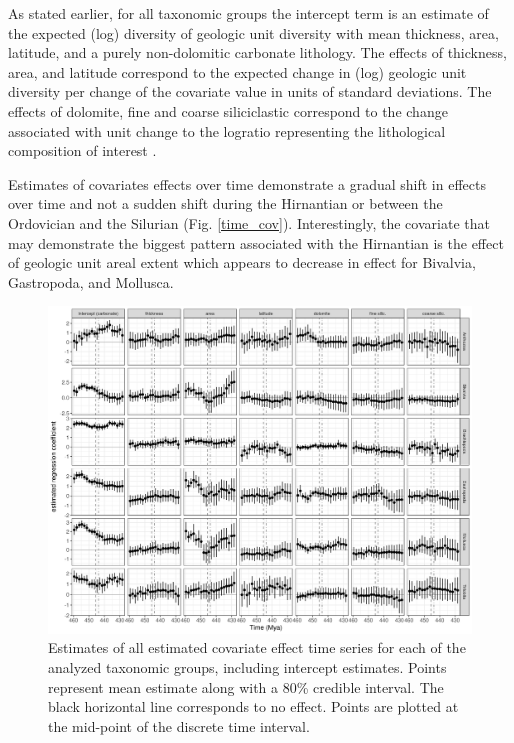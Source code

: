 \documentclass[12pt,letterpaper]{article}
\begin{document}
As stated earlier, for all taxonomic groups the intercept term is an estimate of the expected (log) diversity of geologic unit diversity with mean thickness, area, latitude, and a purely non-dolomitic carbonate lithology. The effects of thickness, area, and latitude correspond to the expected change in (log) geologic unit diversity per change of the covariate value in units of standard deviations. The effects of dolomite, fine and coarse siliciclastic correspond to the change associated with unit change to the logratio representing the lithological composition of interest \citep{Hron2012}.

Estimates of covariates effects over time demonstrate a gradual shift in effects over time and not a sudden shift during the Hirnantian or between the Ordovician and the Silurian (Fig. \ref{time_cov}). Interestingly, the covariate that may demonstrate the biggest pattern associated with the Hirnantian is the effect of geologic unit areal extent which appears to decrease in effect for Bivalvia, Gastropoda, and Mollusca. 
\begin{figure}[ht]
  \centering
  \includegraphics[width=\textwidth,height=0.5\textheight,keepaspectratio=true]{figure/cov_time_diversity}
  \caption{Estimates of all estimated covariate effect time series for each of the analyzed taxonomic groups, including intercept estimates. Points represent mean estimate along with a 80\% credible interval. The black horizontal line corresponds to no effect. Points are plotted at the mid-point of the discrete time interval.}
  \label{fig:time_cov}
\end{figure}
\end{document}
